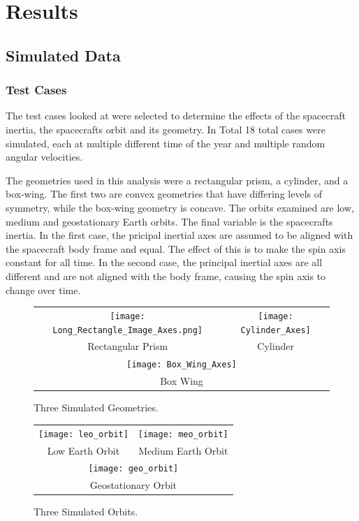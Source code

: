 \chapter{Results}

\section{Simulated Data}

\subsection{Test Cases}

The test cases looked at were selected to determine the effects of the spacecraft inertia, the spacecrafts orbit and its geometry. In Total 18 total cases were simulated, each at multiple different time of the year and multiple random angular velocities.

The geometries used in this analysis were a rectangular prism, a cylinder, and a box-wing. The first two are convex geometries that have differing levels of symmetry, while the box-wing geometry is concave. The orbits examined are low, medium and geostationary Earth orbits. The final variable is the spacecrafts inertia. In the first case, the pricipal inertial axes are assumed to be aligned with the spacecraft body frame and equal. The effect of this is to make the spin axis constant for all time. In the second case, the principal inertial axes are all different and are not aligned with the body frame, causing the spin axis to change over time.

\begin{figure}\label{simulated_geometries}
	\begin{tabular}{cc}
		\texttt{[image: Long\_Rectangle\_Image\_Axes.png]} &
		\texttt{[image: Cylinder\_Axes]} \\
		Rectangular Prism & Cylinder \\
		\multicolumn{2}{c}{\texttt{[image: Box\_Wing\_Axes]}} \\
		\multicolumn{2}{c}{Box Wing}
	\end{tabular}
	\caption{Three Simulated Geometries.}
\end{figure}


\begin{figure}
	\begin{tabular}{cc}
		\texttt{[image: leo\_orbit]} &
		\texttt{[image: meo\_orbit]} \\
		Low Earth Orbit & Medium Earth Orbit \\
		\multicolumn{2}{c}{\texttt{[image: geo\_orbit]}} \\
		\multicolumn{2}{c}{Geostationary Orbit}
	\end{tabular}
	\caption{Three Simulated Orbits.}
\end{figure}

